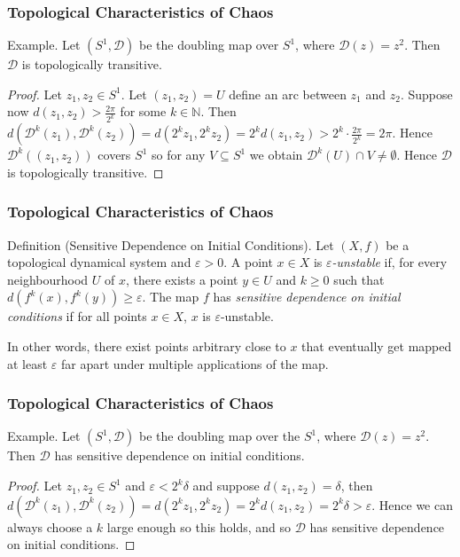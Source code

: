 \documentclass{beamer}
\begin{document}
\begin{frame}
    \frametitle{Topological Characteristics of Chaos}
    \begin{block}{Example.}
        Let $(S^1, \mathcal{D})$ be the doubling map over $S^1$, where $\mathcal{D}(z) = z^2$. Then $\mathcal{D}$ is topologically transitive.
        \begin{proof}
            Let $z_1, z_2 \in S^1$. Let $(z_1, z_2) = U$ define an arc between $z_1$ and $z_2$. Suppose now $d\left(z_1, z_2\right) > \frac{2\pi}{2^k}$ for some $k \in \mathbb{N}$. Then $d\left(\mathcal{D}^k(z_1), \mathcal{D}^k(z_2)\right) = d\left( 2^k z_1, 2^k z_2 \right) = 2^k d\left( z_1, z_2 \right) > 2^k \cdot \frac{2\pi}{2^k} = 2\pi$. Hence $\mathcal{D}^k((z_1, z_2))$ covers $S^1$ so for any $V \subseteq S^1$ we obtain $\mathcal{D}^k(U) \cap V \neq \emptyset$. Hence $\mathcal{D}$ is topologically transitive.
        \end{proof}
    \end{block}
\end{frame}

\begin{frame}
    \frametitle{Topological Characteristics of Chaos}
    \begin{block}{Definition (Sensitive Dependence on Initial Conditions).}
        Let $(X, f)$ be a topological dynamical system and $\varepsilon > 0$. A point $x \in X$ is \emph{$\varepsilon$-unstable} if, for every neighbourhood $U$ of $x$, there exists a point $y \in U$ and $k \geq 0$ such that $d\left(f^k(x), f^k(y)\right) \geq \varepsilon$. The map $f$ has \emph{sensitive dependence on initial conditions} if for all points $x \in X$, $x$ is $\varepsilon$-unstable.
    \end{block}
    \vspace{0.5cm}
    In other words, there exist points arbitrary close to $x$ that eventually get mapped at least $\varepsilon$ far apart under multiple applications of the map.
\end{frame}

\begin{frame}
    \frametitle{Topological Characteristics of Chaos}
    \begin{block}{Example.}
        Let $(S^1, \mathcal{D})$ be the doubling map over the $S^1$, where $\mathcal{D}(z) = z^2$. Then $\mathcal{D}$ has sensitive dependence on initial conditions.
        \begin{proof}
            Let $z_1, z_2 \in S^1$ and $\varepsilon < 2^k \delta$ and suppose $d(z_1, z_2) = \delta$, then $d\left(\mathcal{D}^k(z_1), \mathcal{D}^k(z_2)\right) =  d\left(2^kz_1, 2^kz_2\right) = 2^k d(z_1, z_2) = 2^k \delta > \varepsilon$. Hence we can always choose a $k$ large enough so this holds, and so $\mathcal{D}$ has sensitive dependence on initial conditions.
        \end{proof}
    \end{block}
\end{frame}
\end{document}
